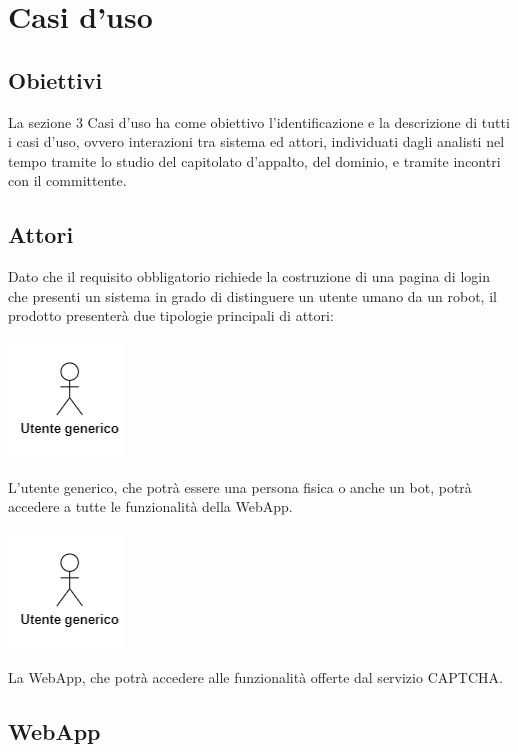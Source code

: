 \section{Casi d'uso}

\subsection{Obiettivi}
La sezione 3 Casi d'uso ha come obiettivo l'identificazione e la descrizione di tutti i casi d'uso, ovvero interazioni tra sistema ed attori, individuati dagli analisti nel tempo tramite lo studio del capitolato d'appalto, del dominio, e tramite incontri con il committente.

\subsection{Attori}
Dato che il requisito obbligatorio richiede la costruzione di una pagina di login che presenti un sistema in grado di distinguere un utente umano da un robot, il prodotto presenterà due tipologie principali di attori:
\begin{center}
\includegraphics[scale = 1]{img/utente_generico.png}\\
\end{center}
L'utente generico, che potrà essere una persona fisica o anche un bot, potrà accedere a tutte le funzionalità della WebApp. \\
\begin{center}
\includegraphics[scale = 1]{img/utente_generico.png}\\
\end{center}
La WebApp, che potrà accedere alle funzionalità offerte dal servizio CAPTCHA. \\

\subsection{WebApp}

